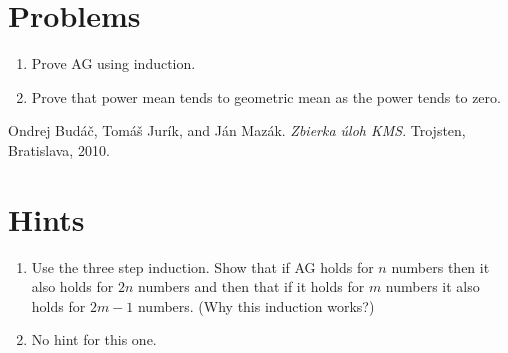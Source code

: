\documentclass[11pt,a5paper]{article}
\begin{document}
\section{Problems}

\begin{enumerate}
	\subsection*{Easy}

	\subsection*{Medium}
	
	\subsection*{Difficult}

	\subsection*{Extra}	
	\item{Prove AG using induction.}
	
	\item{Prove that power mean tends to geometric mean as the power tends to zero.}
\end{enumerate}

\begin{thebibliography}{9}
 Ondrej Budáč, Tomáš Jurík, and Ján Mazák. \emph{Zbierka úloh KMS}. Trojsten, Bratislava, 2010.



\end{thebibliography}

\section{Hints}
\begin{enumerate}
	\subsection*{Easy}

	\subsection*{Medium}
	
	\subsection*{Difficult}

	\subsection*{Extra}	
	\item{Use the three step induction. Show that if AG holds for $n$ numbers then it also holds for $2n$ numbers and then that if it holds for $m$ numbers it also holds for $2m-1$ numbers. (Why this induction works?)}
	
	\item{No hint for this one.}
\end{enumerate}
\end{document}
